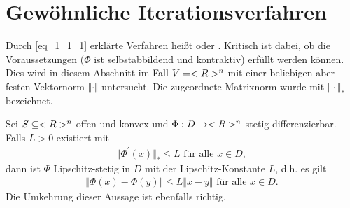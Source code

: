 \section{Gewöhnliche Iterationsverfahren}

Durch \ref{eq_1_1_1} erklärte Verfahren heißt  oder . Kritisch ist dabei, ob die Voraussetzungen ($\Phi$ ist selbstabbildend und kontraktiv) erfüllt werden können. Dies wird in diesem Abschnitt im Fall $V = <R>^n$ mit einer beliebigen aber festen Vektornorm $\Vert \cdot \Vert$ untersucht. Die zugeordnete Matrixnorm wurde mit $\Vert \cdot \Vert_{\ast}$ bezeichnet.

\begin{lemma}
	Sei $S \subseteq <R>^n$ offen und konvex und $\Phi: D \to <R>^n$ stetig differenzierbar. Falls $L > 0$ existiert mit
	\begin{align}
	\Vert \Phi^{'}(x) \Vert_{\ast} \le L \text{ für alle } x \in D, \label{eq_1_1_5}
	\end{align}
	dann ist $\Phi$ Lipschitz-stetig in $D$ mit der Lipschitz-Konstante $L$, d.h. es gilt
	\begin{align}
	\Vert \Phi(x) - \Phi(y)\Vert \le L \Vert x-y \Vert \text{ für alle } x \in D. \label{eq_1_1_6}
	\end{align}
	Die Umkehrung dieser Aussage ist ebenfalls richtig.
\end{lemma}


